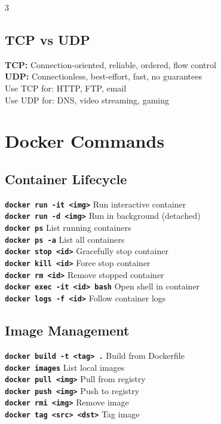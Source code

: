 \documentclass[7pt,landscape]{extarticle}
\newcommand{\cmd}[1]{\textcolor{csPrimary}{\texttt{\textbf{\fontsize{6pt}{7pt}\selectfont#1}}}}
\begin{document}
\begin{multicols*}{3}
\subsection*{TCP vs UDP}
\textbf{TCP:} Connection-oriented, reliable, ordered, flow control \\
\textbf{UDP:} Connectionless, best-effort, fast, no guarantees \\
Use TCP for: HTTP, FTP, email \\
Use UDP for: DNS, video streaming, gaming

\section*{Docker Commands}

\subsection*{Container Lifecycle}
\cmd{docker run -it <img>} \hfill Run interactive container \\
\cmd{docker run -d <img>} \hfill Run in background (detached) \\
\cmd{docker ps} \hfill List running containers \\
\cmd{docker ps -a} \hfill List all containers \\
\cmd{docker stop <id>} \hfill Gracefully stop container \\
\cmd{docker kill <id>} \hfill Force stop container \\
\cmd{docker rm <id>} \hfill Remove stopped container \\
\cmd{docker exec -it <id> bash} \hfill Open shell in container \\
\cmd{docker logs -f <id>} \hfill Follow container logs

\subsection*{Image Management}
\cmd{docker build -t <tag> .} \hfill Build from Dockerfile \\
\cmd{docker images} \hfill List local images \\
\cmd{docker pull <img>} \hfill Pull from registry \\
\cmd{docker push <img>} \hfill Push to registry \\
\cmd{docker rmi <img>} \hfill Remove image \\
\cmd{docker tag <src> <dst>} \hfill Tag image


\end{multicols*}
\end{document}

